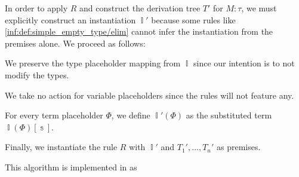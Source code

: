\begin{algorithm}
\begin{thmenum}
    In order to apply \( R \) and construct the derivation tree \( T' \) for \( M: \tau \), we must explicitly construct an instantiation \( \BbbI' \) because some rules like \ref{inf:def:simple_empty_type/elim} cannot infer the instantiation from the premises alone. We proceed as follows:
    \begin{thmenum}
       We preserve the type placeholder mapping from \( \BbbI \) since our intention is to not modify the types.

       We take no action for variable placeholders since the rules will not feature any.

       For every term placeholder \( \Phi \), we define \( \BbbI'(\Phi) \) as the substituted term \( \BbbI(\Phi)[\Bbbs] \).
    \end{thmenum}

    Finally, we instantiate the rule \( R \) with \( \BbbI' \) and \( T_1', \ldots, T_n' \) as premises.
  \end{thmenum}
\end{algorithm}
\begin{comments}
  \item This algorithm is implemented in \cite{notebook:code} as
  \begin{CodeRefDisplay}
  \end{CodeRefDisplay}
\end{comments}

